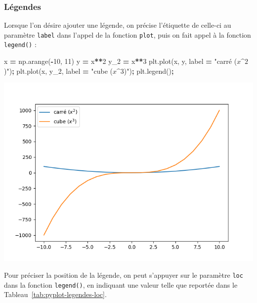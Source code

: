 \documentclass[
  12pt,
]{book}
\newenvironment{Shaded}{\begin{snugshade}}{\end{snugshade}}
\newcommand{\DecValTok}[1]{\textcolor[rgb]{0.00,0.00,0.81}{#1}}
\newcommand{\NormalTok}[1]{#1}
\newcommand{\OperatorTok}[1]{\textcolor[rgb]{0.81,0.36,0.00}{\textbf{#1}}}
\newcommand{\StringTok}[1]{\textcolor[rgb]{0.31,0.60,0.02}{#1}}
\numberwithin{equation}{section}
\numberwithin{countremarque}{section}
\begin{document}
\subsubsection{Légendes}\label{luxe9gendes}

Lorsque l'on désire ajouter une légende, on précise l'étiquette de celle-ci au paramètre \texttt{label} dans l'appel de la fonction \texttt{plot}, puis on fait appel à la fonction \texttt{legend()} :

\begin{Shaded}
\begin{Highlighting}[]
\NormalTok{x }\OperatorTok{=}\NormalTok{ np.arange(}\OperatorTok{{-}}\DecValTok{10}\NormalTok{, }\DecValTok{11}\NormalTok{)}
\NormalTok{y }\OperatorTok{=}\NormalTok{ x}\OperatorTok{**}\DecValTok{2}
\NormalTok{y\_2 }\OperatorTok{=}\NormalTok{ x}\OperatorTok{**}\DecValTok{3}
\NormalTok{plt.plot(x, y, label }\OperatorTok{=} \StringTok{"carré ($x\^{}2$)"}\NormalTok{)}\OperatorTok{;}
\NormalTok{plt.plot(x, y\_2, label }\OperatorTok{=} \StringTok{"cube ($x\^{}3$)"}\NormalTok{)}\OperatorTok{;}
\NormalTok{plt.legend()}\OperatorTok{;}
\end{Highlighting}
\end{Shaded}

\begin{center}\includegraphics[width=9.03in]{figs/pyplot/plot_legende} \end{center}

Pour préciser la position de la légende, on peut s'appuyer sur le paramètre \texttt{loc} dans la fonction \texttt{legend()}, en indiquant une valeur telle que reportée dans le Tableau~\ref{tab:pyplot-legendes-loc}.
\end{document}
